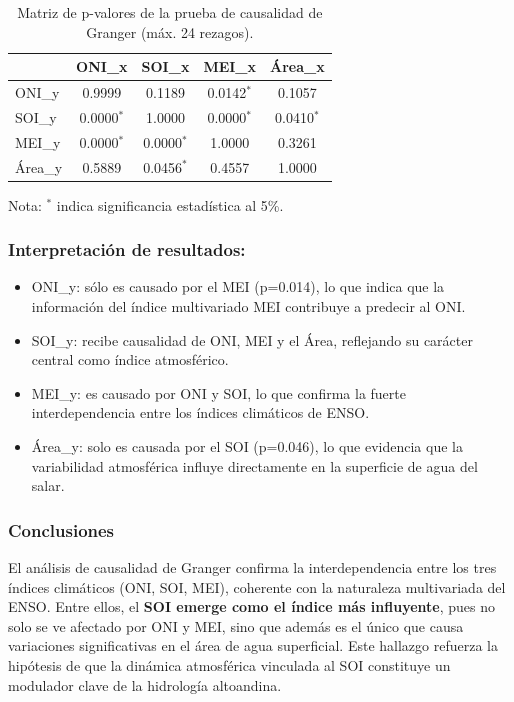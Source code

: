 \begin{table}[H]
    \centering
    \caption{Matriz de p-valores de la prueba de causalidad de Granger (máx. 24 rezagos).}
    \label{tab:granger_matrix}
    \begin{tabular}{lcccc}
        \toprule
        & ONI\_x & SOI\_x & MEI\_x & Área\_x \\
        \midrule
        ONI\_y  & 0.9999   & 0.1189   & 0.0142$^{*}$ & 0.1057   \\
        SOI\_y  & 0.0000$^{*}$ & 1.0000   & 0.0000$^{*}$ & 0.0410$^{*}$ \\
        MEI\_y  & 0.0000$^{*}$ & 0.0000$^{*}$ & 1.0000   & 0.3261   \\
        Área\_y & 0.5889   & 0.0456$^{*}$ & 0.4557   & 1.0000   \\
        \bottomrule
    \end{tabular}
    
    \begin{flushleft}
    {\footnotesize Nota: $^{*}$ indica significancia estadística al 5\%.}
    \end{flushleft}
\end{table}

\subsubsection{Interpretación de resultados:}

\begin{itemize}
    \item ONI\_y: sólo es causado por el MEI (p=0.014), lo que indica que la información del índice multivariado MEI contribuye a predecir al ONI.
    \item SOI\_y: recibe causalidad de ONI, MEI y el Área, reflejando su carácter central como índice atmosférico.
    \item MEI\_y: es causado por ONI y SOI, lo que confirma la fuerte interdependencia entre los índices climáticos de ENSO.
    \item Área\_y: solo es causada por el SOI (p=0.046), lo que evidencia que la variabilidad atmosférica influye directamente en la superficie de agua del salar.
\end{itemize}



\subsubsection{Conclusiones}  
El análisis de causalidad de Granger confirma la interdependencia entre los tres índices climáticos (ONI, SOI, MEI), coherente con la naturaleza multivariada del ENSO. Entre ellos, el \textbf{SOI emerge como el índice más influyente}, pues no solo se ve afectado por ONI y MEI, sino que además es el único que causa variaciones significativas en el área de agua superficial. Este hallazgo refuerza la hipótesis de que la dinámica atmosférica vinculada al SOI constituye un modulador clave de la hidrología altoandina.

